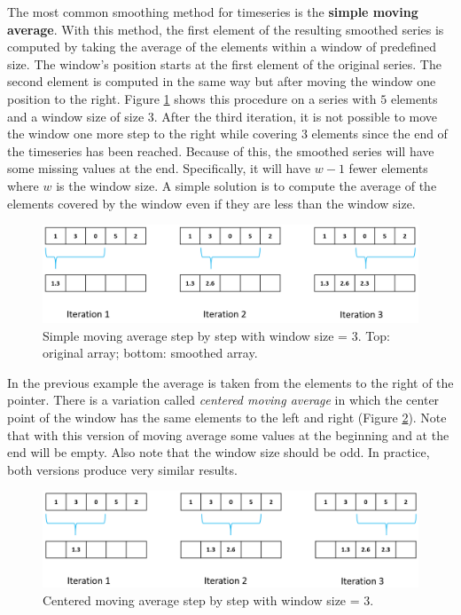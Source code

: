 \documentclass[
  11pt,
]{krantz}
\begin{document}
The most common smoothing method for timeseries is the \textbf{simple moving average}. With this method, the first element of the resulting smoothed series is computed by taking the average of the elements within a window of predefined size. The window's position starts at the first element of the original series. The second element is computed in the same way but after moving the window one position to the right. Figure \ref{fig:movavgsteps} shows this procedure on a series with \(5\) elements and a window size of size \(3\). After the third iteration, it is not possible to move the window one more step to the right while covering \(3\) elements since the end of the timeseries has been reached. Because of this, the smoothed series will have some missing values at the end. Specifically, it will have \(w-1\) fewer elements where \(w\) is the window size. A simple solution is to compute the average of the elements covered by the window even if they are less than the window size.

\begin{figure}

{\centering \includegraphics[width=0.9\linewidth]{images/movingavgsteps} 

}

\caption{Simple moving average step by step with window size = 3. Top: original array; bottom: smoothed array.}\label{fig:movavgsteps}
\end{figure}

In the previous example the average is taken from the elements to the right of the pointer. There is a variation called \emph{centered moving average} in which the center point of the window has the same elements to the left and right (Figure \ref{fig:centeredmovavg}). Note that with this version of moving average some values at the beginning and at the end will be empty. Also note that the window size should be odd. In practice, both versions produce very similar results.

\begin{figure}

{\centering \includegraphics[width=0.9\linewidth]{images/centeredmovavg} 

}

\caption{Centered moving average step by step with window size = 3.}\label{fig:centeredmovavg}
\end{figure}
\end{document}
